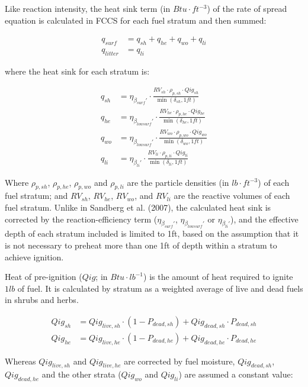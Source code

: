 \documentclass[]{book}
\begin{document}
Like reaction intensity, the heat sink term (in \(Btu \cdot ft^{-3}\))
of the rate of spread equation is calculated in FCCS for each fuel
stratum and then summed:

\begin{eqnarray}
q_{surf} &= q_{sh}+q_{he}+q_{wo}+q_{li}\\
q_{litter} &= q_{li}
\label{eq:heatsink}
\end{eqnarray}

where the heat sink for each stratum is:

\begin{eqnarray}
q_{sh} &= \eta_{\beta_{surf}'}\cdot \frac{RV_{sh}\cdot \rho_{p,sh}\cdot Qig_{sh}}{\min(\delta_{sh}, 1ft)}\\
q_{he} &= \eta_{\beta_{lowsurf}'}\cdot \frac{RV_{he}\cdot \rho_{p,he}\cdot Qig_{he}}{\min(\delta_{he}, 1ft)}\\
q_{wo} &= \eta_{\beta_{lowsurf}'}\cdot \frac{RV_{wo}\cdot \rho_{p,wo}\cdot Qig_{wo}}{\min(\delta_{wo}, 1ft)}\\
q_{li} &= \eta_{\beta_{li}'}\cdot \frac{RV_{li}\cdot \rho_{p,li}\cdot Qig_{li}}{\min(\delta_{li}, 1ft)}
\label{eq:heatsinkstrat}
\end{eqnarray}

Where \(\rho_{p,sh}\), \(\rho_{p,he}\), \(\rho_{p,wo}\) and
\(\rho_{p,li}\) are the particle densities (in \(lb\cdot ft^{-3}\)) of
each fuel stratum; and \(RV_{sh}\), \(RV_{he}\), \(RV_{wo}\), and
\(RV_{li}\) are the reactive volumes of each fuel stratum. Unlike in
Sandberg et al. (2007), the calculated heat sink is corrected by the
reaction-efficiency term (\(\eta_{\beta_{surf}'}\),
\(\eta_{\beta_{lowsurf}'}\) or \(\eta_{\beta_{li}'}\)), and the
effective depth of each stratum included is limited to 1ft, based on the
assumption that it is not necessary to preheat more than one 1ft of
depth within a stratum to achieve ignition.

Heat of pre-ignition (\(Qig\); in \(Btu \cdot lb^{-1}\)) is the amount
of heat required to ignite \(1 lb\) of fuel. It is calculated by stratum
as a weighted average of live and dead fuels in shrubs and herbs.

\begin{eqnarray}
Qig_{sh} &= Qig_{live, sh} \cdot (1 - P_{dead, sh})+ Qig_{dead, sh} \cdot P_{dead, sh}\\
Qig_{he} &= Qig_{live, he} \cdot (1 - P_{dead, he})+ Qig_{dead, he} \cdot P_{dead, he}
\end{eqnarray}

Whereas \(Qig_{live, sh}\) and \(Qig_{live, he}\) are corrected by fuel
moisture, \(Qig_{dead, sh}\), \(Qig_{dead, he}\) and the other strata
(\(Qig_{wo}\) and \(Qig_{li}\)) are assumed a constant value:
\end{document}
